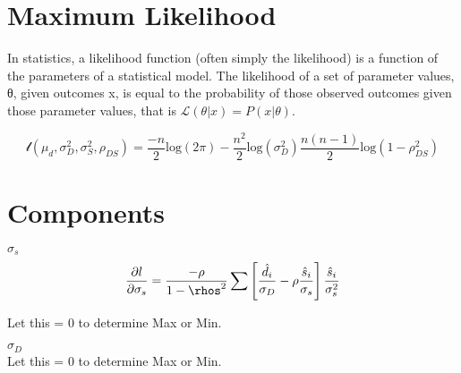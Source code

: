 \section{Maximum Likelihood}

In statistics, a likelihood function (often simply the likelihood) is a function of the parameters of a statistical model. 
The likelihood of a set of parameter values, θ, given outcomes x, is equal to the probability of those 
observed outcomes given those parameter values, that is $\mathcal{L}(\theta |x) = P(x | \theta)$.


\[ \mathcal{l} (\mu_d,\sigma^2_D,\sigma^2_S,\rho_{DS}) = \frac{-n}{2}\mbox{log}(2\pi)  - \frac{n^2}{2}\mbox{log}(\sigma^2_D) 
\frac{n(n-1)}{2}\mbox{log}(1-\rho^2_{DS})

\]

\section{Components}
$\sigma_s$ \\

\[ \frac{ \partial l}{\partial \sigma_s}  = \frac{-\rho}{1-\rhos^2} \sum \left[ \frac{\hat{d}_i}{\sigma_D}  -\rho \frac{\hat{s}_i}{\sigma_s} \right] \frac{\hat{s}_i}{\sigma^2_s} \]

Let this = 0 to determine Max or Min.





$\sigma_D$ \\






Let this = 0 to determine Max or Min.

